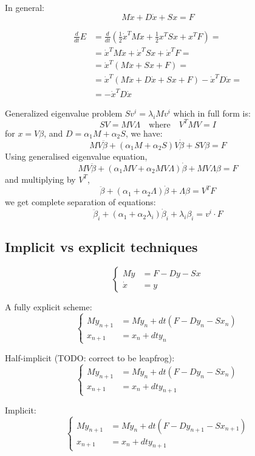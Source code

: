\documentclass{article}
\begin{document}
In general:
\[M\ddot x + D\dot x + Sx = F\]

\begin{align*}
\frac{d}{dt} E
&= \frac{d}{dt}\left(\frac12\dot x^TM\dot x + \frac12 x^TSx + x^TF\right) =\\
&= \dot x^TM\ddot x + \dot x^TS x + \dot x^TF =\\
&= \dot x^T\left(M\ddot x + S x + F\right) =\\
&= \dot x^T\left(M\ddot x + D\dot x + S x + F\right) - \dot x^TD\dot x =\\
&= - \dot x^TD\dot x
\end{align*}

Generalized eigenvalue problem $Sv^i = \lambda_i Mv^i$ which in full form is:
\[SV = MV\Lambda\quad\text{where}\quad V^TMV=I\]
for $x = V\beta$, and $D=\alpha_1M+\alpha_2S$, we have:
\[MV\ddot\beta + (\alpha_1M+\alpha_2S)V\dot\beta + SV\beta = F\]
Using generalised eigenvalue equation,
\[MV\ddot\beta + (\alpha_1MV+\alpha_2MV\Lambda)\dot\beta + MV\Lambda\beta = F\]
and multiplying by $V^T$,
\[\ddot\beta + (\alpha_1+\alpha_2\Lambda)\dot\beta + \Lambda\beta = V^TF\]
we get complete separation of equations:
\[\ddot\beta_i + (\alpha_1+\alpha_2\lambda_i)\dot\beta_i + \lambda_i\beta_i = v^i\cdot F\]


\subsection{Implicit vs explicit techniques}
\[\begin{cases}
M\dot y &= F - Dy - Sx\\
\dot x &= y
\end{cases}\]

A fully explicit scheme:
\[\begin{cases}
M y_{n+1} &= M\dot y_n + dt(F - Dy_n - Sx_n)\\
x_{n+1} &= x_n + dt y_n
\end{cases}\]


Half-implicit (TODO: correct to be leapfrog):
\[\begin{cases}
M y_{n+1} &= M\dot y_n + dt(F - Dy_n - Sx_n)\\
x_{n+1} &= x_n + dt y_{n+1}
\end{cases}\]

Implicit:
\[\begin{cases}
M y_{n+1} &= M\dot y_n + dt(F - Dy_{n+1} - Sx_{n+1})\\
x_{n+1} &= x_n + dt y_{n+1}
\end{cases}\]
\end{document}
